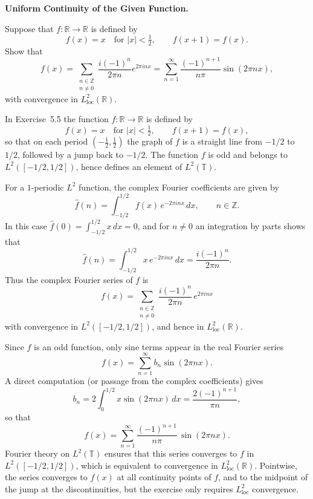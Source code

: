 \begin{problem}[CP-II-0543]
\label{prob:cp-ii-0543}
\textbf{Uniform Continuity of the Given Function.}

\hspace*{1.5em}Suppose that $f:\mathbb{R}\to\mathbb{R}$ is defined by
\[
f(x) = x \quad\text{for } |x| < \tfrac12,
\qquad
f(x+1) = f(x).
\]
Show that
\[
f(x)
= \sum_{\substack{n\in\mathbb{Z}\\ n\neq 0}}
\frac{i(-1)^n}{2\pi n} e^{2\pi i n x}
= \sum_{n=1}^\infty \frac{(-1)^{n+1}}{n\pi}\sin(2\pi n x),
\]
with convergence in $L^2_{\mathrm{loc}}(\mathbb{R})$.

In Exercise~5.5 the function $f:\mathbb{R}\to\mathbb{R}$ is defined by
\[
f(x) = x \quad\text{for } |x|<\tfrac12,
\qquad f(x+1)=f(x),
\]
so that on each period $(-\tfrac12,\tfrac12)$ the graph of $f$ is a
straight line from $-1/2$ to $1/2$, followed by a jump back to $-1/2$.
The function $f$ is odd and belongs to $L^2([-1/2,1/2])$, hence defines
an element of $L^2(\mathbb{T})$.

For a $1$-periodic $L^2$ function, the complex Fourier coefficients are
given by
\[
\widehat{f}(n) = \int_{-1/2}^{1/2} f(x)\,e^{-2\pi i n x}\,dx,
\qquad n\in\mathbb{Z}.
\]
In this case $\widehat{f}(0)=\int_{-1/2}^{1/2}x\,dx=0$, and for
$n\neq 0$ an integration by parts shows that
\[
\widehat{f}(n)
= \int_{-1/2}^{1/2} x\,e^{-2\pi i n x}\,dx
= \frac{i(-1)^n}{2\pi n}.
\]
Thus the complex Fourier series of $f$ is
\[
f(x) = \sum_{\substack{n\in\mathbb{Z}\\ n\neq 0}}
\frac{i(-1)^n}{2\pi n}\,e^{2\pi i n x}
\]
with convergence in $L^2([-1/2,1/2])$, and hence in
$L^2_{\mathrm{loc}}(\mathbb{R})$.

Since $f$ is an odd function, only sine terms appear in the real Fourier
series
\[
f(x) = \sum_{n=1}^\infty b_n \sin(2\pi n x).
\]
A direct computation (or passage from the complex coefficients) gives
\[
b_n = 2\int_0^{1/2} x\sin(2\pi n x)\,dx
= \frac{2(-1)^{n+1}}{\pi n},
\]
so that
\[
f(x) = \sum_{n=1}^\infty \frac{(-1)^{n+1}}{n\pi}\,\sin(2\pi n x).
\]
Fourier theory on $L^2(\mathbb{T})$ ensures that this series converges
to $f$ in $L^2([-1/2,1/2])$, which is equivalent to convergence in
$L^2_{\mathrm{loc}}(\mathbb{R})$.  Pointwise, the series converges to
$f(x)$ at all continuity points of $f$, and to the midpoint of the jump
at the discontinuities, but the exercise only requires $L^2_{\mathrm{loc}}$
convergence.
\end{problem}

